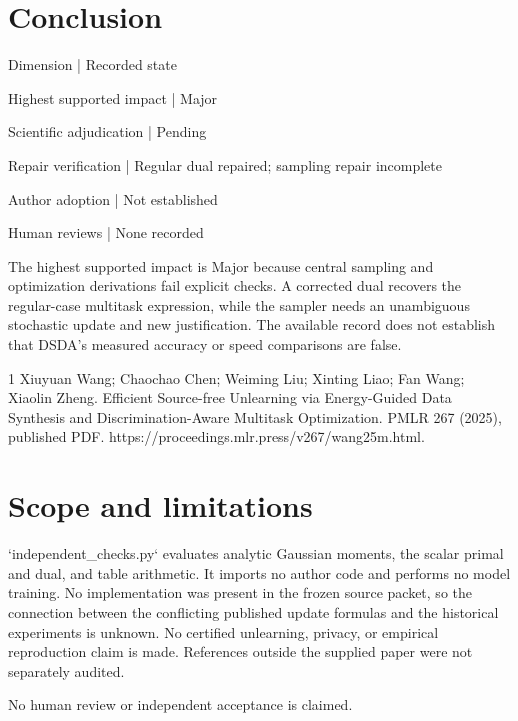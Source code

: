 \documentclass[10pt]{article}
\begin{document}
\section*{Conclusion}
Dimension | Recorded state\par
Highest supported impact | Major\par
Scientific adjudication | Pending\par
Repair verification | Regular dual repaired; sampling repair incomplete\par
Author adoption | Not established\par
Human reviews | None recorded\par
The highest supported impact is Major because central sampling and optimization derivations fail explicit checks. A corrected dual recovers the regular-case multitask expression, while the sampler needs an unambiguous stochastic update and new justification. The available record does not establish that DSDA’s measured accuracy or speed comparisons are false.\par
1 Xiuyuan Wang; Chaochao Chen; Weiming Liu; Xinting Liao; Fan Wang; Xiaolin Zheng. Efficient Source-free Unlearning via Energy-Guided Data Synthesis and Discrimination-Aware Multitask Optimization. PMLR 267 (2025), published PDF. https://proceedings.mlr.press/v267/wang25m.html.\par
\section*{Scope and limitations}
`independent\_checks.py` evaluates analytic Gaussian moments, the scalar primal and dual, and table arithmetic. It imports no author code and performs no model training. No implementation was present in the frozen source packet, so the connection between the conflicting published update formulas and the historical experiments is unknown. No certified unlearning, privacy, or empirical reproduction claim is made. References outside the supplied paper were not separately audited.\par
No human review or independent acceptance is claimed.\par
\end{document}
